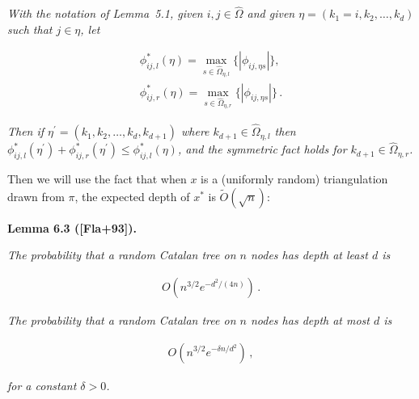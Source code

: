 \documentclass[10pt,a4paper]{article}
\begin{document}
\emph{With the notation of Lemma 5.1, given $i,j\in\hat{\Omega}$ and given $\eta=(k_{1}=i,k_{2},\dots,k_{d})$ such that $j\in\eta$, let}\par


\[\begin{gathered}
\displaystyle\phi_{ij,l}^{*}(\eta) \displaystyle=\max_{s\in\hat{\Omega}_{\eta,l}}\{|\phi_{ij,\eta s}|\}, \\
\displaystyle\phi_{ij,r}^{*}(\eta) \displaystyle=\max_{s\in\hat{\Omega}_{\eta,r}}\{|\phi_{ij,\eta s}|\}\,.
\end{gathered}\]


\emph{Then if $\eta^{\prime}=(k_{1},k_{2},\dots,k_{d},k_{d+1})$ where $k_{d+1}\in\hat{\Omega}_{\eta,l}$ then $\phi_{ij,l}^{*}(\eta^{\prime})+\phi_{ij,r}^{*}(\eta^{\prime})\leq\phi_{ij,l}^{*}(\eta)$, and the symmetric fact holds for $k_{d+1}\in\hat{\Omega}_{\eta,r}$.}\par






Then we will use the fact that when $x$ is a (uniformly random) triangulation drawn from $\pi$, the expected depth of $x^{*}$ is $\widetilde{O}(\sqrt{n})$:\par





\par\medskip\noindent\textbf{\textbf{Lemma 6.3}\textbf{ }([Fla+93])\textbf{.}}\par



\emph{The probability that a random Catalan tree on $n$ nodes has depth at least $d$ is}\par


\[\begin{gathered}
O\left(n^{3/2}e^{-d^{2}/(4n)}\right)\,.
\end{gathered}\]


\emph{The probability that a random Catalan tree on $n$ nodes has depth at most $d$ is}\par


\[\begin{gathered}
O\left(n^{3/2}e^{-\delta n/d^{2}}\right)\,,
\end{gathered}\]


\emph{for a constant $\delta>0$.}\par
\end{document}
